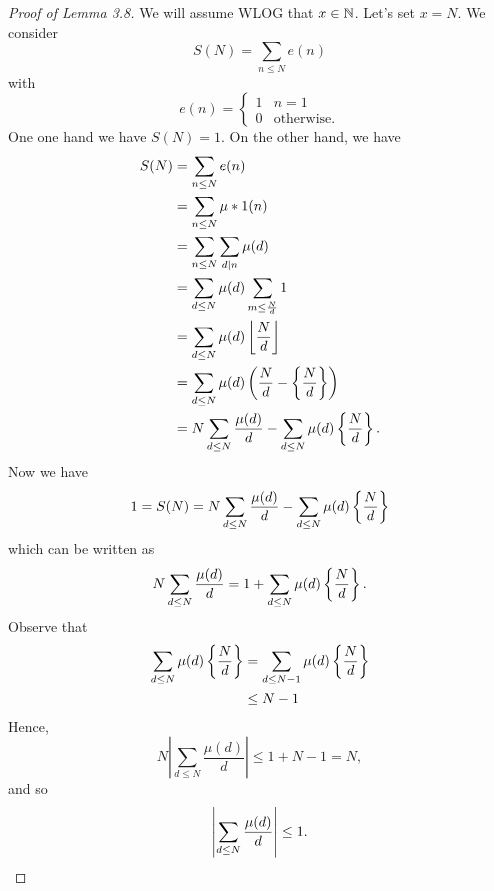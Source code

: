 \documentclass[twoside, openright, fontsize=10pt, headings=big]{scrbook}
\begin{document}
\begin{proof}[Proof of Lemma 3.8]
    We will assume WLOG that $x\in\mathbb{N}$. Let's set $x=N$. We consider
    \[
        S(N)=\sum_{n\leq N}e(n)
    \]
    with
    \[
        e(n)=
        \begin{cases}
            1&n=1\\
            0&\text{otherwise}.
        \end{cases}
    \]
    One one hand we have $S(N)=1$. On the other hand, we have
    \begin{align*}
        S(N)&=\sum_{n\leq N}e(n)\\
        &=\sum_{n\leq N}\mu\ast1(n)\\
        &=\sum_{n\leq N}\sum_{d\mid n}\mu(d)\\
        &=\sum_{d\leq N}\mu(d)\sum_{m\leq\frac{N}{d}}1\\
        &=\sum_{d\leq N}\mu(d)\left\lfloor \frac{N}{d} \right\rfloor\\
        &=\sum_{d\leq N}\mu(d)\left(\frac{N}{d}-\left\{ \frac{N}{d} \right\}\right)\\
        &=N\sum_{d\leq N}\frac{\mu(d)}{d}-\sum_{d\leq N}\mu(d)\left\{ \frac{N}{d} \right\}.
    \end{align*} 
    Now we have
    \[
        1=S(N)=N\sum_{d\leq N}\frac{\mu(d)}{d}-\sum_{d\leq N}\mu(d)\left\{ \frac{N}{d} \right\}
    \]
    which can be written as 
    \[
        N\sum_{d\leq N}\frac{\mu(d)}{d}=1+\sum_{d\leq N}\mu(d)\left\{ \frac{N}{d} \right\}.
    \]
    Observe that
    \begin{align*}
        \sum_{d\leq N}\mu(d)\left\{ \frac{N}{d} \right\}&=\sum_{d\leq N-1}\mu(d)\left\{ \frac{N}{d} \right\}\\
        &\leq N-1
    \end{align*}
    Hence, 
    \[
        N\left|\sum_{d\leq N}\frac{\mu(d)}{d}\right|\leq 1+N-1=N,
    \]
    and so
    \[
        \left|\sum_{d\leq N}\frac{\mu(d)}{d}\right|\leq1.\qedhere
    \]
\end{proof}
\end{document}
